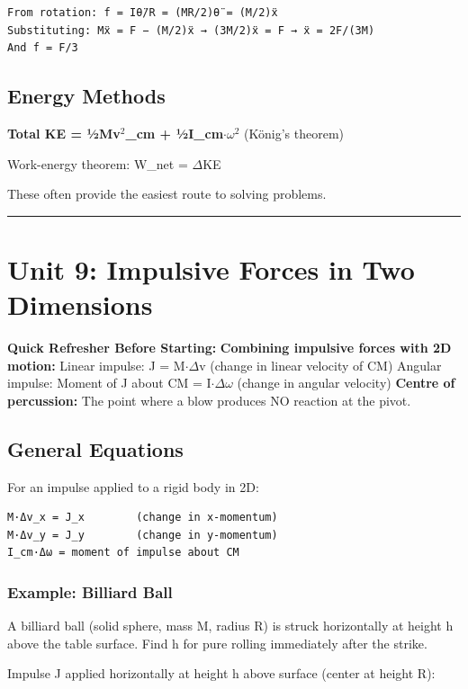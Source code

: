 \documentclass[12pt,a4paper,openany]{book}
\begin{document}
{{\begin{verbatim}
From rotation: f = Iθ̈/R = (MR/2)θ̈ = (M/2)ẍ
Substituting: Mẍ = F − (M/2)ẍ → (3M/2)ẍ = F → ẍ = 2F/(3M)
And f = F/3
\end{verbatim}

\subsection{Energy Methods}

\textbf{Total KE = ½Mv$^2$_cm + ½I_cm$\cdot\omega^2$} (König's theorem)

Work-energy theorem: W_net = $\Delta$KE

These often provide the easiest route to solving problems.

\bigskip\noindent\rule{\textwidth}{0.4pt}\bigskip

\section{Unit 9: Impulsive Forces in Two Dimensions}

\begin{prereqbox}
 \textbf{Quick Refresher Before Starting:}
\textbf{Combining impulsive forces with 2D motion:}
Linear impulse: J = M$\cdot\Delta$v (change in linear velocity of CM)
Angular impulse: Moment of J about CM = I$\cdot\Delta\omega$ (change in angular velocity)
\textbf{Centre of percussion:} The point where a blow produces NO reaction at the pivot.
\end{prereqbox}


\subsection{General Equations}

For an impulse applied to a rigid body in 2D:

\begin{verbatim}
M·Δv_x = J_x        (change in x-momentum)
M·Δv_y = J_y        (change in y-momentum)
I_cm·Δω = moment of impulse about CM
\end{verbatim}

\subsubsection{Example: Billiard Ball}
A billiard ball (solid sphere, mass M, radius R) is struck horizontally at height h above the table surface. Find h for pure rolling immediately after the strike.

Impulse J applied horizontally at height h above surface (center at height R):

}}
\end{document}
